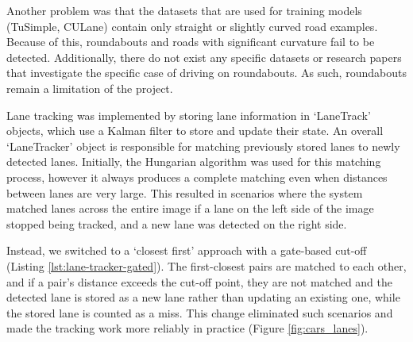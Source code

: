 \documentclass{article}
\begin{document}
Another problem was that the datasets that are used for training models (TuSimple, CULane) contain only straight or slightly curved road examples. Because of this, roundabouts and roads with significant curvature fail to be detected. Additionally, there do not exist any specific datasets or research papers that investigate the specific case of driving on roundabouts. As such, roundabouts remain a limitation of the project.

Lane tracking was implemented by storing lane information in `LaneTrack’ objects, which use a Kalman filter to store and update their state. An overall `LaneTracker’ object is responsible for matching previously stored lanes to newly detected lanes. Initially, the Hungarian algorithm \cite{kuhn1955hungarian} was used for this matching process, however it always produces a complete matching even when distances between lanes are very large. This resulted in scenarios where the system matched lanes across the entire image if a lane on the left side of the image stopped being tracked, and a new lane was detected on the right side. 

Instead, we switched to a ‘closest first’ approach with a gate-based cut-off (Listing \ref{lst:lane-tracker-gated}). The first-closest pairs are matched to each other, and if a pair’s distance exceeds the cut-off point, they are not matched and the detected lane is stored as a new lane rather than updating an existing one, while the stored lane is counted as a miss. This change eliminated such scenarios and made the tracking work more reliably in practice (Figure \ref{fig:cars_lanes}).
\end{document}
